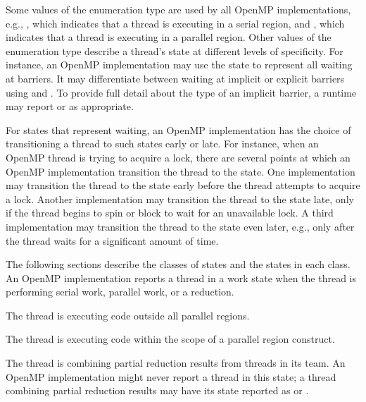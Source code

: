 Some values of the enumeration type  are used by all 
OpenMP implementations, 
e.g., , 
which indicates that a thread is executing in a serial region, and  
, 
which indicates that a thread is executing in a parallel region.
Other values of the enumeration type describe a thread's state at 
different levels of specificity. 
For instance, an OpenMP implementation may use 
the state   to represent all 
waiting at barriers. It may differentiate between waiting at implicit or explicit barriers using
 and . 
To provide full detail about the type of an implicit barrier, a runtime may report 
 or 
 as appropriate.

For states that represent waiting, an OpenMP implementation has the 
choice of transitioning a thread to such states early or late.
For instance, when an OpenMP thread is trying to acquire a lock,
there are several points at which an OpenMP implementation
transition the thread to the  state.
One implementation may transition the thread to the state 
early before the thread attempts to acquire a
lock. Another implementation may transition the thread to the state 
late, only if the thread begins to spin or
block to wait for an unavailable lock. A third implementation
may transition the thread to the state even later, e.g., only
after the thread waits for a significant amount of time. 

The following sections describe the classes of states and the states in each class.
An OpenMP implementation reports a thread in a work state 
when the thread is performing serial work, parallel work, or a reduction.

\begin{description}

\item {} 

  The thread is executing code outside all parallel regions. 

\item {} 

  The thread is executing code within the scope of a parallel region construct.

\sloppy
\item {} 
 
  The thread is combining partial reduction results from threads in its team. 
  An OpenMP implementation  
  might never report a thread in this state; a thread
  combining partial reduction results may have its state reported as
   or .

\end{description}


